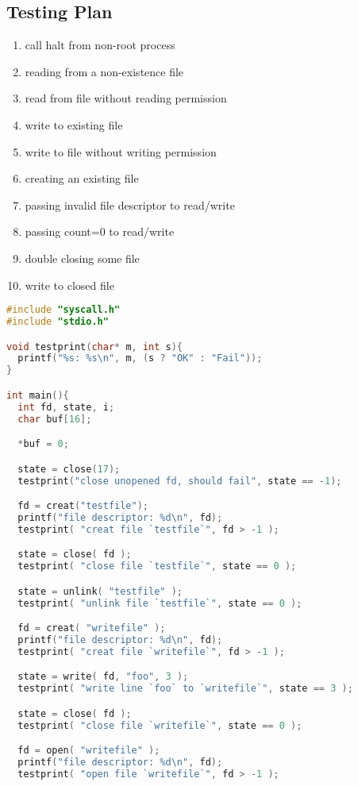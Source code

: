 \documentclass{article}
\begin{document}
\begin{spacing}{1.1}
\subsection{Testing Plan}
\begin{enumerate}
\item call \textsf{halt} from non-root process
\item reading from a non-existence file
\item read from file without reading permission
\item write to existing file
\item write to file without writing permission
\item creating an existing file
\item passing invalid file descriptor to read/write
\item passing \textsf{count=0} to read/write
\item double closing some file
\item write to closed file
\end{enumerate}
\begin{lstlisting}[language=C]
#include "syscall.h"
#include "stdio.h"

void testprint(char* m, int s){
  printf("%s: %s\n", m, (s ? "OK" : "Fail"));
}

int main(){
  int fd, state, i;
  char buf[16];

  *buf = 0;

  state = close(17);
  testprint("close unopened fd, should fail", state == -1);

  fd = creat("testfile");
  printf("file descriptor: %d\n", fd);
  testprint( "creat file `testfile`", fd > -1 );

  state = close( fd );
  testprint( "close file `testfile`", state == 0 );

  state = unlink( "testfile" );
  testprint( "unlink file `testfile`", state == 0 );

  fd = creat( "writefile" );
  printf("file descriptor: %d\n", fd);
  testprint( "creat file `writefile`", fd > -1 );

  state = write( fd, "foo", 3 );
  testprint( "write line `foo` to `writefile`", state == 3 );

  state = close( fd );
  testprint( "close file `writefile`", state == 0 );

  fd = open( "writefile" );
  printf("file descriptor: %d\n", fd);
  testprint( "open file `writefile`", fd > -1 );


\end{lstlisting}
\end{spacing}
\end{document}

